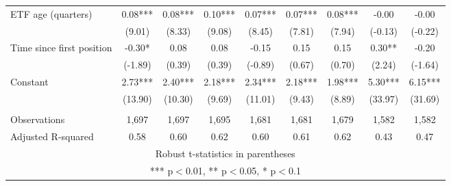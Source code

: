 \documentclass[]{article}
\begin{document}
\begin{tabular}{lcccccccc}
ETF age (quarters) & 0.08*** & 0.08*** & 0.10*** & 0.07*** & 0.07*** & 0.08*** & -0.00 & -0.00 \\
 & (9.01) & (8.33) & (9.08) & (8.45) & (7.81) & (7.94) & (-0.13) & (-0.22) \\
Time since first position & -0.30* & 0.08 & 0.08 & -0.15 & 0.15 & 0.15 & 0.30** & -0.20 \\
 & (-1.89) & (0.39) & (0.39) & (-0.89) & (0.67) & (0.70) & (2.24) & (-1.64) \\
Constant & 2.73*** & 2.40*** & 2.18*** & 2.34*** & 2.18*** & 1.98*** & 5.30*** & 6.15*** \\
 & (13.90) & (10.30) & (9.69) & (11.01) & (9.43) & (8.89) & (33.97) & (31.69) \\
 &  &  &  &  &  &  &  &  \\
Observations & 1,697 & 1,697 & 1,695 & 1,681 & 1,681 & 1,679 & 1,582 & 1,582 \\
 Adjusted R-squared & 0.58 & 0.60 & 0.62 & 0.60 & 0.61 & 0.62 & 0.43 & 0.47 \\ \hline
\multicolumn{9}{c}{ Robust t-statistics in parentheses} \\
\multicolumn{9}{c}{ *** p$<$0.01, ** p$<$0.05, * p$<$0.1} \\
\end{tabular}
\end{document}
